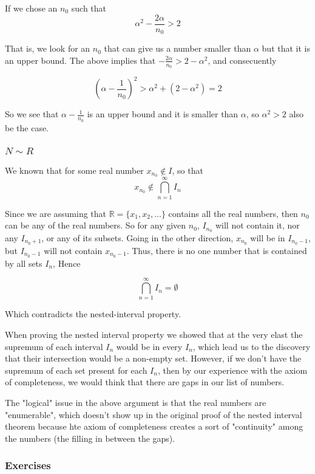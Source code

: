 If we chose an $n_0$ such that 
$$
\alpha^2 - \frac{2\alpha}{n_0} > 2
$$

That is, we look for an $n_0$ that can give us a number smaller than $\alpha$ but that it is an upper bound.
The above implies that $- \frac{2\alpha}{n_0} > 2 - \alpha^2$, and consecuently

$$
\left( \alpha - \frac{1}{n_0} \right)^2 >
    \alpha^2 + (2 - \alpha^2) = 2
$$

So we see that $\alpha - \frac{1}{n_0}$ is an upper bound and it is smaller than $\alpha$,
so $\alpha^2 > 2$ also be the case.


\subsubsection{$N \sim R$}

We known that for some real number $x_{n_0} \notin I$, so that
$$
x_{n_0} \notin \bigcap^{\infty}_{n=1} I_n
$$

Since we are assuming that $\mathbb{R} = \{ x_1, x_2, ... \}$ contains all the real numbers,
then $n_0$ can be any of the real numbers.
So for any given $n_0$, $I_{n_0}$ will not contain it, nor any $I_{n_0+1}$, or any of its subsets.
Going in the other direction, $x_{n_0}$ will be in $I_{n_0 - 1}$, but
$I_{n_0 - 1}$ will not contain $x_{n_0-1}$.
Thus, there is no one number that is contained by all sets $I_n$, Hence

$$
\bigcap^{\infty}_{n=1} I_n = \emptyset
$$

Which contradicts the nested-interval property.

When proving the nested interval property we showed that at the very elast the supremum of each interval $I_n$
would be in every $I_n$, which lead us to the discovery that their intersection would be a non-empty set.
However, if we don't have the supremum of each set present for each $I_n$, then by our experience with the axiom
of completeness, we would think that there are gaps in our list of numbers.

The "logical" issue in the above argument is that the real numbers are "enumerable", which doesn't show up in the original
proof of the nested interval theorem because hte axiom of completeness creates a sort of "continuity" among the numbers
(the filling in between the gaps).


\subsubsection{Exercises}

